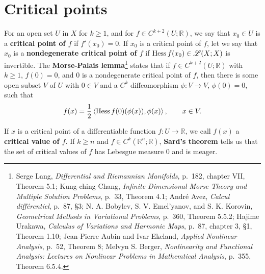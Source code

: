 \documentclass{article}
\newcommand{\inner}[2]{\left\langle #1, #2 \right\rangle}
\newcommand{\Hess}{\ensuremath\mathrm{Hess}\,}
\theoremstyle{definition}
\theoremstyle{definition}
\begin{document}
\section{Critical points}
For an open set $U$ in $X$ for $k \geq 1$, and for $f \in C^{k+2}(U;\mathbb{R})$, we say that $x_0 \in U$ is a \textbf{critical point of
$f$} if $f'(x_0)=0$. If $x_0$ is a critical point of $f$, let we say that $x_0$ is a \textbf{nondegenerate critical point of $f$}
if $\Hess f(x_0) \in \mathscr{L}(X;X)$ is invertible. 
The \textbf{Morse-Palais lemma}\footnote{Serge Lang, {\em Differential and Riemannian Manifolds},
p.~182, chapter VII, Theorem 5.1; Kung-ching Chang, {\em Infinite Dimensional Morse Theory and Multiple
Solution Problems}, p.~33, Theorem 4.1; 
Andr\'e Avez, {\em Calcul diff\'erentiel}, p.~87, \S 3;
N. A. Bobylev, S. V. Emel'yanov, and S. K. Korovin, {\em Geometrical Methods in Variational Problems}, p.~360, Theorem 5.5.2;
Hajime Urakawa, {\em Calculus of Variations and Harmonic Maps}, p.~87, chapter 3, \S  1, Theorem 1.10;
Jean-Pierre Aubin and Ivar Ekeland, {\em Applied Nonlinear Analysis}, p.~52, Theorem 8;
Melvyn S. Berger, {\em Nonlinearity and Functional Analysis: Lectures on Nonlinear Problems in Mathemtical Analysis},
p.~355, Theorem 6.5.4.}
states that if
$f \in C^{k+2}(U;\mathbb{R})$ with $k \geq 1$, $f(0)=0$, and $0$ is a nondegenerate critical point of $f$, then there is some
open subset $V$ of $U$ with $0 \in V$ and
a $C^k$ diffeomorphism $\phi:V \to V$, $\phi(0)=0$, such that
\[
f(x) = \frac{1}{2}\inner{\Hess f(0)(\phi(x))}{\phi(x)}, \qquad x \in V.
\]


If $x$ is a critical point of a differentiable function $f:U \to \mathbb{R}$, we call $f(x)$ a \textbf{critical value of $f$}.
If $k \geq n$ and $f \in C^k(\mathbb{R}^n;\mathbb{R})$, \textbf{Sard's theorem} tells us that
 the set of critical values of $f$ has Lebesgue measure  $0$ and is meager.
 
\end{document}
